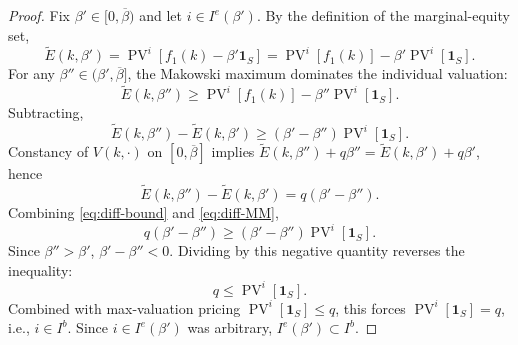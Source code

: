 \documentclass[11pt,a4paper,oneside]{book}
\def\1{\mathbf{1}}
\def\leq{\leqslant}
\def\geq{\geqslant}
\DeclareMathOperator{\PV}{PV}
\theoremstyle{plain}
\theoremstyle{definition}
\theoremstyle{remark}
\numberwithin{equation}{chapter}
\begin{document}
\begin{proof}
Fix $\beta' \in [0, \overline{\beta})$ and let $i \in I^e(\beta')$. By the definition of the marginal-equity set,
\begin{equation*}
  \widetilde{E}(k, \beta') = \PV^i[f_1(k) - \beta' \1_S] = \PV^i[f_1(k)] - \beta' \PV^i[\1_S].
\end{equation*}
For any $\beta'' \in (\beta', \overline{\beta}]$, the Makowski maximum dominates the individual valuation:
\begin{equation}
  \widetilde{E}(k, \beta'') \geq \PV^i[f_1(k)] - \beta'' \PV^i[\1_S].
  \label{eq:makowski-dominance}
\end{equation}
Subtracting,
\begin{equation}
  \widetilde{E}(k, \beta'') - \widetilde{E}(k, \beta') \geq (\beta' - \beta'') \PV^i[\1_S].
  \label{eq:diff-bound}
\end{equation}
Constancy of $V(k, \cdot)$ on $[0, \overline{\beta}]$ implies $\widetilde{E}(k, \beta'') + q \beta'' = \widetilde{E}(k, \beta') + q \beta'$, hence
\begin{equation}
  \widetilde{E}(k, \beta'') - \widetilde{E}(k, \beta') = q(\beta' - \beta'').
  \label{eq:diff-MM}
\end{equation}
Combining \eqref{eq:diff-bound} and \eqref{eq:diff-MM},
\begin{equation*}
  q(\beta' - \beta'') \geq (\beta' - \beta'') \PV^i[\1_S].
\end{equation*}
Since $\beta'' > \beta'$, $\beta' - \beta'' < 0$. Dividing by this negative quantity reverses the inequality:
\begin{equation*}
  q \leq \PV^i[\1_S].
\end{equation*}
Combined with max-valuation pricing $\PV^i[\1_S] \leq q$, this forces $\PV^i[\1_S] = q$, i.e., $i \in I^b$. Since $i \in I^e(\beta')$ was arbitrary, $I^e(\beta') \subset I^b$.
\end{proof}
\end{document}
